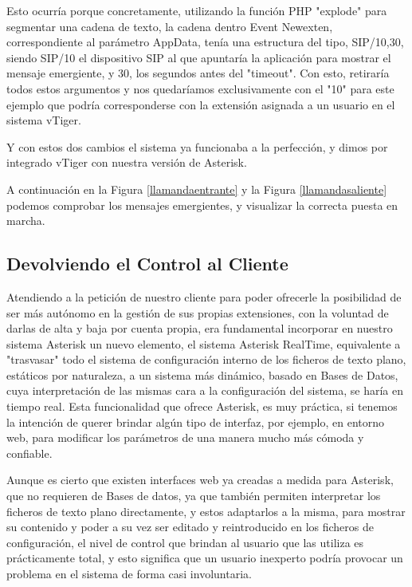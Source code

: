 Esto ocurría porque concretamente, utilizando la función PHP "explode" para segmentar una cadena de texto, la cadena dentro Event Newexten, correspondiente al parámetro AppData, tenía una estructura del tipo, SIP/10,30, siendo SIP/10 el dispositivo SIP al que apuntaría la aplicación para mostrar el mensaje emergiente, y 30, los segundos antes del "timeout". Con esto, retiraría todos estos argumentos y nos quedaríamos exclusivamente con el "10" para este ejemplo que podría corresponderse con la extensión asignada a un usuario en el sistema vTiger.

Y con estos dos cambios el sistema ya funcionaba a la perfección, y dimos por integrado vTiger con nuestra versión de Asterisk.

A continuación en la Figura \ref{llamandaentrante} y la Figura \ref{llamandasaliente} podemos comprobar los mensajes emergientes, y visualizar la correcta puesta en marcha.



\subsection{Devolviendo el Control al Cliente}

Atendiendo a la petición de nuestro cliente para poder ofrecerle la posibilidad de ser más autónomo en la gestión de sus propias extensiones, con la voluntad de darlas de alta y baja por cuenta propia, era fundamental incorporar en nuestro sistema Asterisk un nuevo elemento, el sistema Asterisk RealTime, equivalente a "trasvasar" todo el sistema de configuración interno de los ficheros de texto plano, estáticos por naturaleza, a un sistema más dinámico, basado en Bases de Datos, cuya interpretación de las mismas cara a la configuración del sistema, se haría en tiempo real. Esta funcionalidad que ofrece Asterisk, es muy práctica, si tenemos la intención de querer brindar algún tipo de interfaz, por ejemplo, en entorno web, para modificar los parámetros de una manera mucho más cómoda y confiable.

Aunque es cierto que existen interfaces web ya creadas a medida para Asterisk, que no requieren de Bases de datos, ya que también permiten interpretar los ficheros de texto plano directamente, y estos adaptarlos a la misma, para mostrar su contenido y poder a su vez ser editado y reintroducido en los ficheros de configuración, el nivel de control que brindan al usuario que las utiliza es prácticamente total, y esto significa que un usuario inexperto podría provocar un problema en el sistema de forma casi involuntaria. 

